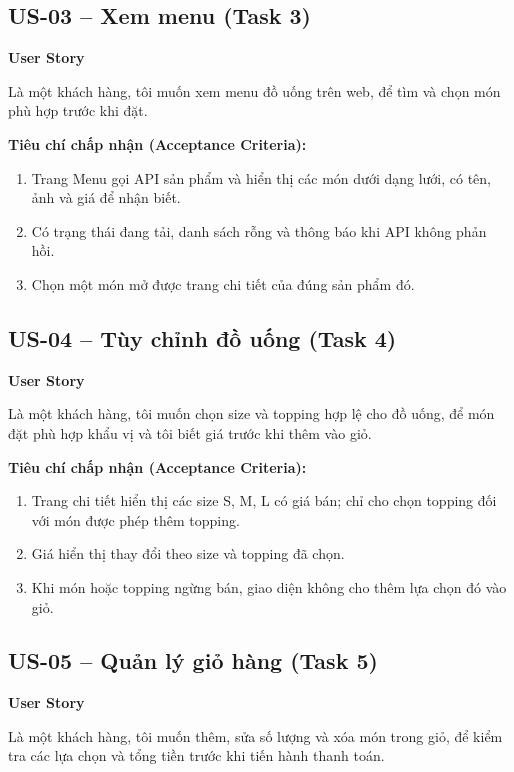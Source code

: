 \subsection{US-03 -- Xem menu (Task 3)}
\textbf{User Story}\par
Là một khách hàng, tôi muốn xem menu đồ uống trên web, để tìm và chọn món phù hợp trước khi đặt.

\textbf{Tiêu chí chấp nhận (Acceptance Criteria):}
\begin{enumerate}
  \item Trang Menu gọi API sản phẩm và hiển thị các món dưới dạng lưới, có tên, ảnh và giá để nhận biết.
  \item Có trạng thái đang tải, danh sách rỗng và thông báo khi API không phản hồi.
  \item Chọn một món mở được trang chi tiết của đúng sản phẩm đó.
\end{enumerate}

\subsection{US-04 -- Tùy chỉnh đồ uống (Task 4)}
\textbf{User Story}\par
Là một khách hàng, tôi muốn chọn size và topping hợp lệ cho đồ uống, để món đặt phù hợp khẩu vị và tôi biết giá trước khi thêm vào giỏ.

\textbf{Tiêu chí chấp nhận (Acceptance Criteria):}
\begin{enumerate}
  \item Trang chi tiết hiển thị các size S, M, L có giá bán; chỉ cho chọn topping đối với món được phép thêm topping.
  \item Giá hiển thị thay đổi theo size và topping đã chọn.
  \item Khi món hoặc topping ngừng bán, giao diện không cho thêm lựa chọn đó vào giỏ.
\end{enumerate}

\subsection{US-05 -- Quản lý giỏ hàng (Task 5)}
\textbf{User Story}\par
Là một khách hàng, tôi muốn thêm, sửa số lượng và xóa món trong giỏ, để kiểm tra các lựa chọn và tổng tiền trước khi tiến hành thanh toán.

